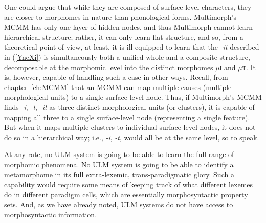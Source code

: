 One could argue that while they are composed of surface-level characters,
they are closer to morphomes in nature than phonological forms.
 Multimorph's \ac{MCMM} has only one layer of hidden nodes,
and thus Multimorph cannot learn hierarchical structure; rather, it can only learn 
flat structure, and so, from a theoretical point of view, at least, it is ill-equipped to learn
that the \textit{-it} described in (\ref{YneXi}) is simultaneously 
both a unified whole and a composite structure,
decomposable at the morphomic level into the distinct morphomes 
$\mu$\textsc{i} and $\mu$\textsc{t}.
It is, however, capable of handling such a case in other ways. 
Recall, from chapter~\ref{ch:MCMM} 
that an \ac{MCMM} can map multiple causes (multiple morphological units)
 to a single surface-level node. Thus, if Multimorph's \ac{MCMM} finds 
 \textit{-i}, \textit{-t}, \textit{-it} as three distinct
 morphological units (or clusters), it is capable of mapping all three 
 to a single surface-level node (representing a single feature). 
 But when it maps multiple clusters to individual surface-level nodes, 
 it does not do so in a hierarchical way; i.e., \textit{-i}, \textit{-t},  would
 all be at the same level, so to speak.


At any rate, no \ac{ULM} system is going to be able to learn the full range of morphomic
phenomena. No \ac{ULM} system is going to be able to identify a metamorphome in its full
 extra-lexemic, trans-paradigmatic glory. Such a capability would require some means
of keeping track of what different lexemes do in different paradigm cells, which are essentially 
morphosyntactic property sets. And, as we have already noted, \ac{ULM} systems do not
have access to morphosyntactic information.

